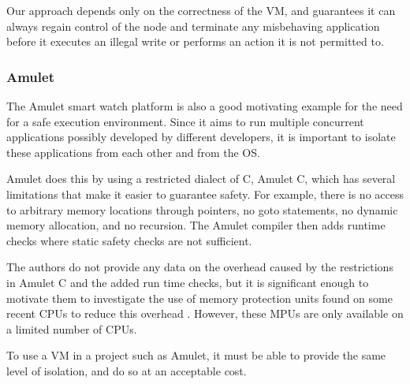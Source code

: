 Our approach depends only on the correctness of the VM, and guarantees it can always regain control of the node and terminate any misbehaving application before it executes an illegal write or performs an action it is not permitted to.

\subsubsection{Amulet}
The Amulet \cite{Hester:2016je} smart watch platform is also a good motivating example for the need for a safe execution environment. Since it aims to run multiple concurrent applications possibly developed by different developers, it is important to isolate these applications from each other and from the OS.

Amulet does this by using a restricted dialect of C, Amulet C, which has several limitations that make it easier to guarantee safety. For example, there is no access to arbitrary memory locations through pointers, no goto statements, no dynamic memory allocation, and no recursion. The Amulet compiler then adds runtime checks where static safety checks are not sufficient.

The authors do not provide any data on the overhead caused by the restrictions in Amulet C and the added run time checks, but it is significant enough to motivate them to investigate the use of memory protection units found on some recent CPUs to reduce this overhead \cite{Hardin:2017cq}. However, these MPUs are only available on a limited number of CPUs.

To use a VM in a project such as Amulet, it must be able to provide the same level of isolation, and do so at an acceptable cost.


